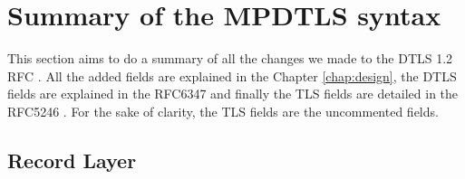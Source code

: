 \chapter{Summary of the MPDTLS syntax}
\label{app:mpdtls-summary}

This section aims to do a summary of all the changes we made to the DTLS 1.2 RFC \cite{rfc6347}. All the added fields are explained in the Chapter \ref{chap:design}, the DTLS fields are explained in the RFC6347 and finally the TLS fields are detailed in the RFC5246 \cite{rfc5246}. For the sake of clarity, the TLS fields are the uncommented fields.

\section{Record Layer}

